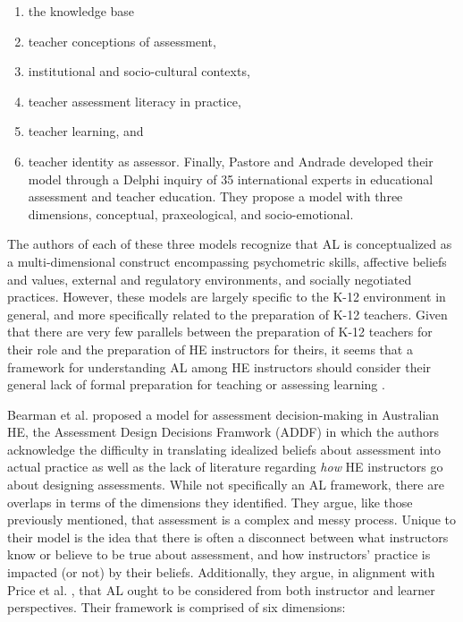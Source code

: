 \documentclass[
]{book}
\providecommand{\tightlist}{%
  \setlength{\itemsep}{0pt}\setlength{\parskip}{0pt}}
\begin{document}
\begin{enumerate}
\def\labelenumi{\arabic{enumi}.}
\tightlist
\item
  the knowledge base
\item
  teacher conceptions of assessment,
\item
  institutional and socio-cultural contexts,
\item
  teacher assessment literacy in practice,
\item
  teacher learning, and
\item
  teacher identity as assessor.
  Finally, Pastore and Andrade \citeyearpar{pastoreTeacherAssessmentLiteracy2019} developed their model through a Delphi inquiry of 35 international experts in educational assessment and teacher education. They propose a model with three dimensions, conceptual, praxeological, and socio-emotional.
\end{enumerate}

The authors of each of these three models recognize that AL is conceptualized as a multi-dimensional construct encompassing psychometric skills, affective beliefs and values, external and regulatory environments, and socially negotiated practices. However, these models are largely specific to the K-12 environment in general, and more specifically related to the preparation of K-12 teachers. Given that there are very few parallels between the preparation of K-12 teachers for their role and the preparation of HE instructors for theirs, it seems that a framework for understanding AL among HE instructors should consider their general lack of formal preparation for teaching or assessing learning \citep{lipnevichWhatGradesMean2020, masseyAssessmentLiteracyCollege2020}.

Bearman et al. \citeyearpar{bearmanSupportAssessmentPractice2016} proposed a model for assessment decision-making in Australian HE, the Assessment Design Decisions Framwork (ADDF) in which the authors acknowledge the difficulty in translating idealized beliefs about assessment into actual practice as well as the lack of literature regarding \emph{how} HE instructors go about designing assessments. While not specifically an AL framework, there are overlaps in terms of the dimensions they identified. They argue, like those previously mentioned, that assessment is a complex and messy process. Unique to their model is the idea that there is often a disconnect between what instructors know or believe to be true about assessment, and how instructors' practice is impacted (or not) by their beliefs. Additionally, they argue, in alignment with Price et al. \citeyearpar{priceIfWasGoing2011}, that AL ought to be considered from both instructor and learner perspectives. Their framework is comprised of six dimensions:
\end{document}
